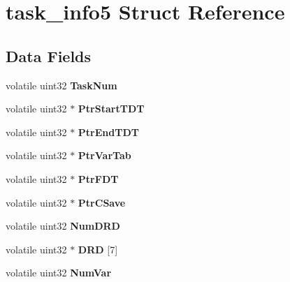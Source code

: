 \hypertarget{structtask__info5}{}\section{task\+\_\+info5 Struct Reference}
\label{structtask__info5}
\subsection*{Data Fields}
\begin{DoxyCompactItemize}
\item 
\mbox{\label{structtask__info5_ab72e46a59f1ee0ed065433c54c5f143c}} 
volatile uint32 {\bfseries Task\+Num}
\item 
\mbox{\label{structtask__info5_a76639c4c24bc8be7bcff330956e4c5cf}} 
volatile uint32 $\ast$ {\bfseries Ptr\+Start\+T\+DT}
\item 
\mbox{\label{structtask__info5_ae833c6e71712d27497955c1d4b1db3a5}} 
volatile uint32 $\ast$ {\bfseries Ptr\+End\+T\+DT}
\item 
\mbox{\label{structtask__info5_a877b9fb821e43135bbe1b5b33e1a681c}} 
volatile uint32 $\ast$ {\bfseries Ptr\+Var\+Tab}
\item 
\mbox{\label{structtask__info5_ac865ee317bbc9b6b1f8e1eb185c86a22}} 
volatile uint32 $\ast$ {\bfseries Ptr\+F\+DT}
\item 
\mbox{\label{structtask__info5_a4ec513db2a63fc39de992820e588843c}} 
volatile uint32 $\ast$ {\bfseries Ptr\+C\+Save}
\item 
\mbox{\label{structtask__info5_a64bb2423b8a6c3245cf45a5d0f66cf75}} 
volatile uint32 {\bfseries Num\+D\+RD}
\item 
\mbox{\label{structtask__info5_a7652c8df88bf4147afa892826bee2e3d}} 
volatile uint32 $\ast$ {\bfseries D\+RD} \mbox{[}7\mbox{]}
\item 
\mbox{\label{structtask__info5_a4c7ac96f4fde8d9d2474ba54aaf44762}} 
volatile uint32 {\bfseries Num\+Var}
\item 

\end{DoxyCompactItemize}
